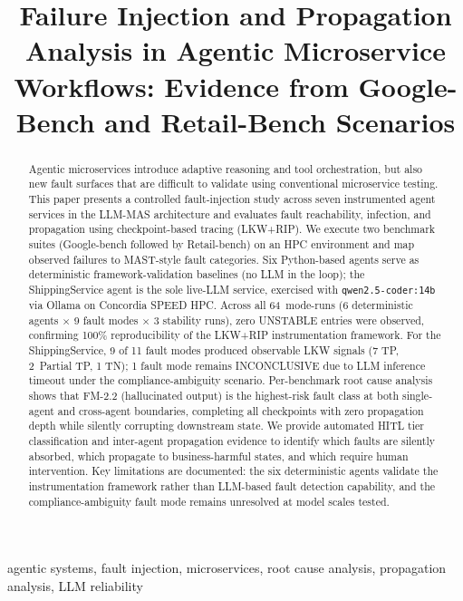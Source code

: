 \documentclass[conference]{IEEEtran}
\title{Failure Injection and Propagation Analysis in Agentic Microservice
  Workflows: Evidence from Google-Bench and Retail-Bench Scenarios}
\author{%
  \IEEEauthorblockN{Deepak Sunil Chavan}
  \IEEEauthorblockA{%
    Department of Electrical and Computer Engineering\\
    Concordia University, Montreal, Canada\\
    Email: deepaksunil.chavan@concordia.ca}}
\begin{document}
\maketitle

\begin{abstract}
Agentic microservices introduce adaptive reasoning and tool orchestration,
but also new fault surfaces that are difficult to validate using conventional
microservice testing. This paper presents a controlled fault-injection study
across seven instrumented agent services in the LLM-MAS architecture and
evaluates fault reachability, infection, and propagation using
checkpoint-based tracing (LKW+RIP). We execute two benchmark suites
(Google-bench followed by Retail-bench) on an HPC environment and map observed
failures to MAST-style fault categories. Six Python-based agents serve as
deterministic framework-validation baselines (no LLM in the loop); the
ShippingService agent is the sole live-LLM service, exercised with
\texttt{qwen2.5-coder:14b} via Ollama on Concordia SPEED HPC. Across all
64~mode-runs (6 deterministic agents $\times$ 9 fault modes $\times$ 3
stability runs), zero UNSTABLE entries were observed, confirming 100\%
reproducibility of the LKW+RIP instrumentation framework. For the
ShippingService, 9 of 11 fault modes produced observable LKW signals (7 TP,
2~Partial TP, 1 TN); 1 fault mode remains INCONCLUSIVE due to LLM inference
timeout under the compliance-ambiguity scenario. Per-benchmark root cause
analysis shows that FM-2.2 (hallucinated output) is the highest-risk fault
class at both single-agent and cross-agent boundaries, completing all
checkpoints with zero propagation depth while silently corrupting downstream
state. We provide automated HITL tier classification and inter-agent
propagation evidence to identify which faults are silently absorbed, which
propagate to business-harmful states, and which require human intervention.
Key limitations are documented: the six deterministic agents validate the
instrumentation framework rather than LLM-based fault detection capability,
and the compliance-ambiguity fault mode remains unresolved at model scales
tested.
\end{abstract}

\begin{IEEEkeywords}
agentic systems, fault injection, microservices, root cause analysis,
propagation analysis, LLM reliability
\end{IEEEkeywords}
\end{document}
